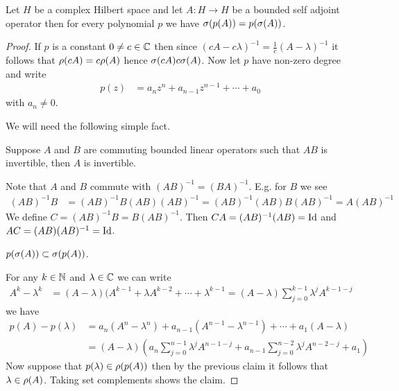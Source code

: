 \begin{lem}\label{hilbert:SpectralMappingPolynomialBoundedSelfAdjoint}Let $H$ be a complex Hilbert space and let $A :H \to H$ be a bounded self adjoint operator then for every polynomial $p$ we have $\sigma(p(A)) = p(\sigma(A))$.
\end{lem}
\begin{proof}
If $p$ is a constant $0 \neq c \in \mathbb{C}$ then since $(c A - c \lambda)^{-1}  = \frac{1}{c} (A - \lambda)^{-1}$ it follows that $\rho(cA) = c \rho(A)$ hence $\sigma(cA) c\sigma(A)$.  Now let $p$ have non-zero degree and write 
\begin{align*}
p(z) &= a_n z^n + a_{n-1} z^{n-1} + \dotsb + a_0
\end{align*}
with $a_n \neq 0$.  

We will need the following simple fact.
\begin{clm}Suppose $A$ and $B$ are commuting bounded linear operators such that $AB$ is invertible, then $A$ is invertible.
\end{clm}
Note that $A$ and $B$ commute with $(AB)^{-1} = (BA)^{-1}$.  E.g. for $B$ we see
\begin{align*}
(AB)^{-1} B  &= (AB)^{-1} B (AB) (AB) ^{-1}  =  (AB)^{-1} (AB) B  (AB) ^{-1} = A  (AB) ^{-1}
\end{align*}
We define $C = (AB)^{-1}B = B(AB)^{-1}$.  Then $C A = (AB)^{-1} (AB) = \operatorname*{Id}$ and $A C = (A B) (AB)^{-1} = \operatorname*{Id}$.

\begin{clm} $p(\sigma(A)) \subset \sigma(p(A))$.
\end{clm}
For any $k \in \mathbb{N}$ and $\lambda \in \mathbb{C}$ we can write
\begin{align*}
A^k - \lambda^k &= (A - \lambda) (A^{k-1} + \lambda A^{k-2} + \dotsb + \lambda^{k-1} = (A - \lambda) \sum_{j=0}^{k-1} \lambda^{j} A^{k-1-j}
\end{align*}
we have
\begin{align*}
p(A) - p(\lambda) &=  a_n (A^n - \lambda^n) + a_{n-1} (A^{n-1} - \lambda^{n-1})  + \dotsb + a_1 (A - \lambda) \\
&= (A - \lambda) \left ( a_n \sum_{j=0}^{n-1} \lambda^{j} A^{n-1-j} + a_{n-1} \sum_{j=0}^{n-2} \lambda^{j} A^{n-2-j} + a_1 \right )
\end{align*}
Now suppose that $p(\lambda) \in \rho(p(A))$ then by the previous claim it follows that $\lambda \in \rho(A)$.  Taking set complements shows the claim.


\end{proof}
